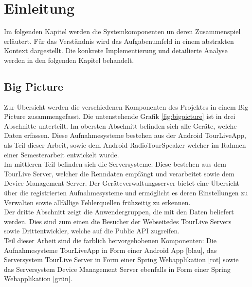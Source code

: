 \chapter{Einleitung}

Im folgenden Kapitel werden die Systemkomponenten un deren Zusammenspiel erläutert. Für das Verständnis wird das Aufgabenumfeld in einem abstrakten Kontext dargestellt. Die konkrete Implementierung und detailierte Analyse werden in den folgenden Kapitel behandelt.

\section{Big Picture}
Zur Übersicht werden die verschiedenen Komponenten des Projektes in einem Big Picture zusammengefasst. Die untenstehende Grafik \ref{fig:bigpicture} ist in drei Abschnitte unterteilt. Im obersten Abschnitt befinden sich alle Geräte, welche Daten erfassen. Diese Aufnahmesysteme bestehen aus der Android TourLiveApp, als Teil dieser Arbeit, sowie dem Android RadioTourSpeaker welcher im Rahmen einer Semesterarbeit \cite{radiotourspeaker2012} entwickelt wurde.\\

Im mittleren Teil befinden sich die Serversysteme. Diese bestehen aus dem TourLive Server, welcher die Renndaten empfängt und verarbeitet sowie dem Device Management Server. Der Geräteverwaltungsserver bietet eine Übersicht über die registrierten Aufnahmesysteme und ermöglicht es deren Einstellungen zu Verwalten sowie allfällige Fehlerquellen frühzeitig zu erkennen.\\

Der dritte Abschnitt zeigt die Anwendergruppen, die mit den Daten beliefert werden. Dies sind zum einen die Besucher der Webseitedes TourLive Servers sowie Drittentwickler, welche auf die Public API zugreifen.\\

Teil dieser Arbeit sind die farblich hervorgehobenen Komponenten: Die Aufnahmesysteme TourLiveApp in Form einer Android App [blau], das Serversystem TourLive Server in Form einer Spring Webapplikation [rot] sowie das Serversystem Device Management Server ebenfalls in Form einer Spring Webapplikation [grün].

